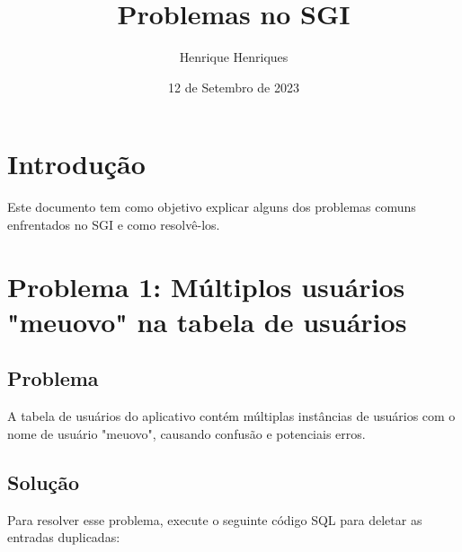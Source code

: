 \documentclass[12pt]{article}
\title{Problemas no SGI}
\author{Henrique Henriques}
\date{12 de Setembro de 2023}
\begin{document}
\maketitle

\section{Introdução}
Este documento tem como objetivo explicar alguns dos problemas comuns enfrentados no SGI e como resolvê-los.

\section{Problema 1: Múltiplos usuários "meuovo" na tabela de usuários}
\subsection{Problema}
A tabela de usuários do aplicativo contém múltiplas instâncias de usuários com o nome de usuário "meuovo", causando confusão e potenciais erros.

\subsection{Solução}
Para resolver esse problema, execute o seguinte código SQL para deletar as entradas duplicadas:
\end{document}

